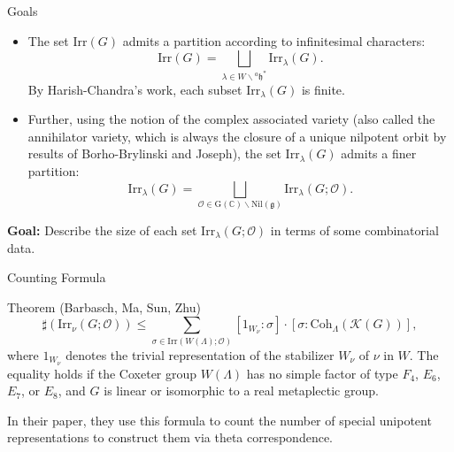 \documentclass[fleqn,xcolor=dvipsnames]{beamer}
\newcommand{\CK}{{\mathcal {K}}}
\newcommand{\CO}{{\mathcal {O}}}
\newcommand{\RG}{{\mathrm {G}}}
\newcommand{\Irr}{{\mathrm{Irr}}}
\newcommand{\Nil}{{\mathrm{Nil}}}
\begin{document}
\begin{frame}{Goals}
  \begin{itemize}
  \item The set \(\Irr(G)\) admits a partition according to infinitesimal characters:
  \[
    \Irr(G) = \bigsqcup\limits_{\lambda \in W \backslash {^{a}\mathfrak{h}}^*} \Irr_{\lambda}(G).
  \]
  By Harish-Chandra's work, each subset \(\Irr_{\lambda}(G)\) is finite.
  
  \pause\item Further, using the notion of the complex associated variety (also called the annihilator variety, which is always the \alert{closure of a unique nilpotent orbit} by results of Borho-Brylinski and Joseph), the set \(\Irr_{\lambda}(G)\) admits a finer partition:
  \[
    \Irr_{\lambda}(G) = \bigsqcup\limits_{\mathcal{O} \in \RG(\mathbb{C}) \backslash \Nil(\mathfrak{g})} \Irr_{\lambda}(G; \mathcal{O}).
  \]
\end{itemize}

\medskip

\noindent
\pause\textbf{Goal:} Describe the size of each set \(\Irr_{\lambda}(G; \mathcal{O})\) in terms of some combinatorial data.
\end{frame}









\begin{frame}{Counting Formula}
\begin{block}{Theorem (Barbasch, Ma, Sun, Zhu)}
  \begin{equation*}
        \sharp(\Irr_{\nu}(G;\CO)) \leq \sum\limits_{\sigma \in \Irr(W(\Lambda);\CO)} [1_{W_\nu}:\sigma] \cdot [\sigma:\mathrm{Coh}_{\Lambda}(\CK(G))],
    \end{equation*}
    where $1_{W_\nu}$ denotes the trivial representation of the stabilizer $W_\nu$ of $\nu$ in $W$. The \alert{equality holds} if the Coxeter group $W(\Lambda)$ has no simple factor of type $F_4$, $E_6$, $E_7$, or $E_8$, and $G$ is linear or isomorphic to a real metaplectic group.
\end{block}

\pause In their paper, they use this formula to count the number of special unipotent representations to construct them via theta correspondence.

\end{frame}
\end{document}
